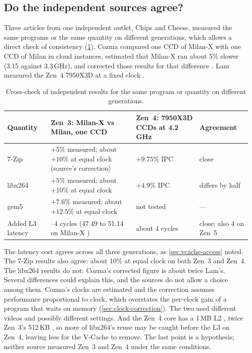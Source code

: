 \subsection{Do the independent sources agree?}
\label{sec:cross-check}
Three articles from one independent outlet, Chips and Cheese, measured the same programs or the same quantity on different generations, which allows a direct check of consistency (\cref{tab:cross-check}). Cozma compared one CCD of Milan-X with one CCD of Milan in cloud instances, estimated that Milan-X ran about 5\% slower (3.15 against 3.3\,GHz), and corrected those results for that difference \cite{cozmaDeepDivingZen2022}. Lam measured the Zen~4 7950X3D at a fixed clock \cite{lamAMDs7950X3DZen2023}.

\begin{table}[htbp]
  \centering
  \caption[Cross-check of independent results across generations]{Cross-check of independent results for the same program or quantity on different generations.}
  \label{tab:cross-check}
  \small
  \begin{tabularx}{\textwidth}{@{}l>{\raggedright\arraybackslash}X>{\raggedright\arraybackslash}X>{\raggedright\arraybackslash}p{2.3cm}@{}}
    \toprule
    \textbf{Quantity} & \textbf{Zen~3: Milan-X vs Milan, one CCD \cite{cozmaDeepDivingZen2022}} & \textbf{Zen~4: 7950X3D CCDs at 4.2\,GHz \cite{lamAMDs7950X3DZen2023}} & \textbf{Agreement} \\
    \midrule
    7-Zip & $+5\%$ measured; about $+10\%$ at equal clock (source's correction) & $+9.75\%$ IPC & close \\
    libx264 & $+5\%$ measured; about $+10\%$ at equal clock & $+4.9\%$ IPC & differs by half \\
    gem5 & $+7.6\%$ measured; about $+12.5\%$ at equal clock & not tested & --- \\
    Added L3 latency & 3--4 cycles (47.49 to 51.14 on Milan-X \cite{cozmaAMDsVCacheTested2022}) & about 4 cycles & close; also 4 on Zen~5 \cite{cozmaAMDs9800X3D2nd2024} \\
    \bottomrule
  \end{tabularx}
\end{table}

The latency cost agrees across all three generations, as \cref{sec:vcache-access} noted. The 7-Zip results also agree: about 10\% at equal clock on both Zen~3 and Zen~4. The libx264 results do not: Cozma's corrected figure is about twice Lam's. Several differences could explain this, and the sources do not allow a choice among them. Cozma's clocks are estimated and the correction assumes performance proportional to clock, which overstates the per-clock gain of a program that waits on memory (\cref{sec:clock-correction}). The two used different videos and possibly different settings. And the Zen~4 core has a 1\,MB L2 \cite{advancedmicrodevicesinc.4thGenAMD2023}, twice Zen~3's 512\,KB \cite[slide~19]{wuu2022vcache}, so more of libx264's reuse may be caught before the L3 on Zen~4, leaving less for the V-Cache to remove. The last point is a hypothesis; neither source measured Zen~3 and Zen~4 under the same conditions.


